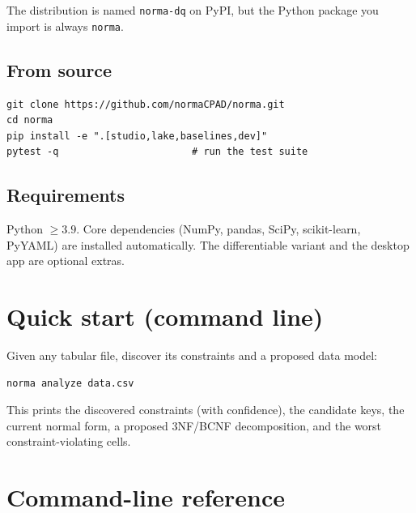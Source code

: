 \documentclass[11pt,a4paper]{article}
\newcommand{\code}[1]{\texttt{#1}}
\begin{document}
\noindent The distribution is named \code{norma-dq} on PyPI, but the Python package you
import is always \code{norma}.

\subsection{From source}
\begin{lstlisting}
git clone https://github.com/normaCPAD/norma.git
cd norma
pip install -e ".[studio,lake,baselines,dev]"
pytest -q                       # run the test suite
\end{lstlisting}

\subsection{Requirements}
Python $\geq 3.9$. Core dependencies (NumPy, pandas, SciPy, scikit-learn, PyYAML) are
installed automatically. The differentiable variant and the desktop app are optional extras.

\section{Quick start (command line)}
Given any tabular file, discover its constraints and a proposed data model:
\begin{lstlisting}
norma analyze data.csv
\end{lstlisting}
This prints the discovered constraints (with confidence), the candidate keys, the current
normal form, a proposed 3NF/BCNF decomposition, and the worst constraint-violating cells.

\section{Command-line reference}
\end{document}
